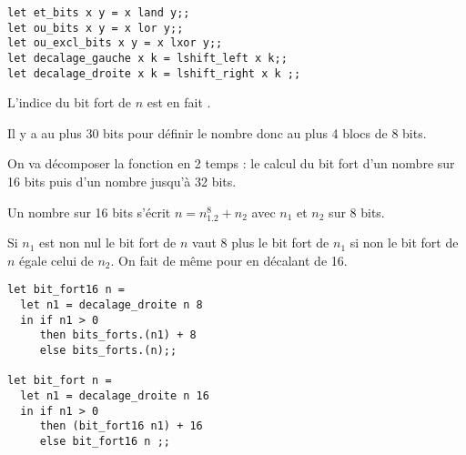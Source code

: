 \begin{lstlisting}
let et_bits x y = x land y;;
let ou_bits x y = x lor y;;
let ou_excl_bits x y = x lxor y;;
let decalage_gauche x k = lshift_left x k;;
let decalage_droite x k = lshift_right x k ;;
\end{lstlisting}
\begin{Exercise}
L'indice du bit fort de $n$  est en fait .
\end{Exercise}
\begin{Exercise}
Il y a au plus 30 bits pour définir le nombre donc au plus 4 blocs de 8 bits.

On va décomposer la fonction en 2 temps : le calcul du bit fort d'un nombre sur 16 bits puis d'un nombre jusqu'à 32 bits.

Un nombre sur 16 bits s'écrit $n = n_1.2^8 + n_2$ avec $n_1$ et $n_2$ sur 8 bits.

Si $n_1$ est non nul le bit fort de $n$ vaut 8 plus le bit fort de $n_1$ si non le bit fort de $n$ égale celui de $n_2$. On fait de même pour  en décalant de 16.
\begin{lstlisting}
let bit_fort16 n =
  let n1 = decalage_droite n 8
  in if n1 > 0
     then bits_forts.(n1) + 8
     else bits_forts.(n);;
     
let bit_fort n =
  let n1 = decalage_droite n 16
  in if n1 > 0
     then (bit_fort16 n1) + 16
     else bit_fort16 n ;;
\end{lstlisting}
\end{Exercise}
\newpage
